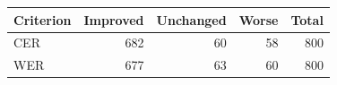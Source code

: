 \begin{tabular}{lrrrr}
\toprule
Criterion & Improved & Unchanged & Worse & Total \\
\midrule
CER & 682 & 60 & 58 & 800 \\
WER & 677 & 63 & 60 & 800 \\
\bottomrule
\end{tabular}
